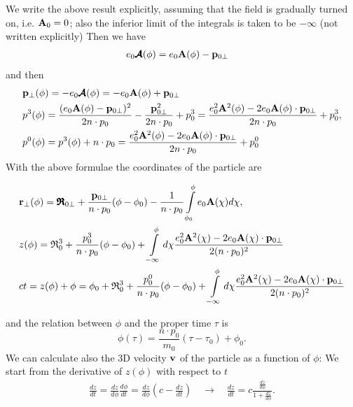 We write the above result explicitly, assuming that the field is gradually turned on, i.e. \({\bf A}_0=0\); also the inferior limit of the integrals is taken to be \(-\infty\) (not written explicitly)
Then we have
\begin{align}
     & e_0{\pmb{\cal A}}(\phi) =e_0 {\bf A}(\phi) - {\bf p}_{0\perp}
\end{align}
and then
\begin{align}
     & {\bf p}_{\perp}(\phi) = -e_0{\pmb{\cal A}}(\phi) = -e_0{\bf A}(\phi) + {\bf p}_{0\perp}                                                                                                                        \\
     & p^3(\phi) =\frac{(e_0{\bf A}(\phi)-{\bf p}_{0\perp})^2}{2n\cdot p_0}-\frac{{\bf p}_{0\perp}^2}{2n\cdot p_0}+p_{0}^3 = \frac{e_0^2{\bf A}^2(\phi)-2e_0{\bf A}(\phi)\cdot{\bf p}_{0\perp}}{2n\cdot p_0}+p_{0}^3, \\
     & p^0(\phi) = p^3(\phi) + n\cdot p_0 = \frac{e_0^2{\bf A}^2(\phi)-2e_0{\bf A}(\phi)\cdot{\bf p}_{0\perp}}{2n\cdot p_0}+p_{0}^0
\end{align}
With the above formulae the coordinates of the particle are\begin{importantbox}
    \begin{align}
         & {\bf r}_{\perp}(\phi)={\pmb{\mathfrak R}}_{0\perp}+\frac{{\bf p}_{0\perp}}{n\cdot p_0}(\phi-\phi_0)-\frac{1}{n\cdot p_0}\int\limits_{\phi_0}^{\phi}e_0{\bf A}(\chi)d\chi,                                     \\
         & z(\phi)={\mathfrak R}_{0}^3+\frac{p_0^3}{n\cdot p_0}(\phi-\phi_0)+\int\limits_{-\infty}^{\phi}d\chi\frac{e_0^2{\bf A}^2(\chi)-2e_0{\bf A}(\chi)\cdot{\bf p}_{0\perp}}{2(n\cdot p_0)^2}                        \\
         & ct = z(\phi) + \phi = \phi_0 + {\mathfrak R}_{0}^3+\frac{p_0^0}{n\cdot p_0}(\phi-\phi_0)+\int\limits_{-\infty}^{\phi}d\chi\frac{e_0^2{\bf A}^2(\chi)-2e_0{\bf A}(\chi)\cdot{\bf p}_{0\perp}}{2(n\cdot p_0)^2}
    \end{align}\end{importantbox}
and the relation between $\phi$ and the proper time $\tau$ is
\begin{equation}
    \phi(\tau) = \frac{n\cdot p_0}{m_0}(\tau-\tau_0)+\phi_0.
\end{equation}
We can calculate also the 3D velocity ${\bf v}$ of the particle as a function of \(\phi\): We start from the derivative of $z(\phi)$ with respect to $t$
\begin{align}
    \frac{dz}{dt} = \frac{dz}{d\phi}\frac{d\phi}{dt} = \frac{dz}{d\phi} \left(c-\frac{dz}{dt}\right) \quad \longrightarrow \quad \frac{dz}{dt} = c\frac{\frac{dz}{d\phi}}{1+\frac{dz}{d\phi}}.
\end{align}
